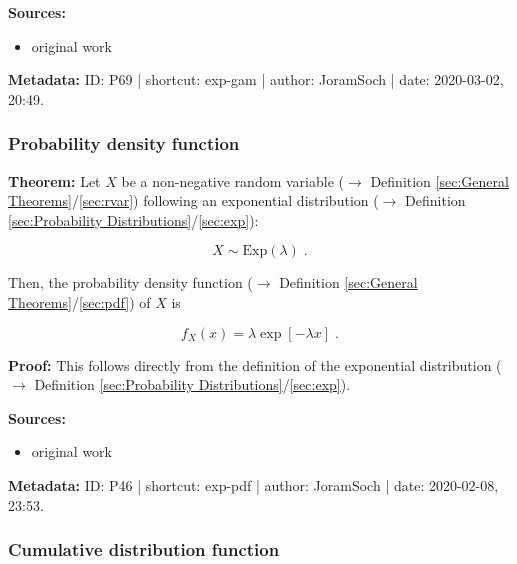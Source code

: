 \documentclass[a4paper,12pt,twoside]{book}
\begin{document}
\vspace{1em}
\textbf{Sources:}
\begin{itemize}
\item original work\end{itemize}


\vspace{1em}
\textbf{Metadata:} ID: P69 | shortcut: exp-gam | author: JoramSoch | date: 2020-03-02, 20:49.
\vspace{1em}



\subsubsection[\textbf{Probability density function}]{Probability density function} \label{sec:exp-pdf}
\setcounter{equation}{0}

\textbf{Theorem:} Let $X$ be a non-negative random variable ($\rightarrow$ Definition \ref{sec:General Theorems}/\ref{sec:rvar}) following an exponential distribution ($\rightarrow$ Definition \ref{sec:Probability Distributions}/\ref{sec:exp}):

\begin{equation} \label{eq:exp-pdf-exp}
X \sim \mathrm{Exp}(\lambda) \; .
\end{equation}

Then, the probability density function ($\rightarrow$ Definition \ref{sec:General Theorems}/\ref{sec:pdf}) of $X$ is

\begin{equation} \label{eq:exp-pdf-gam-pdf}
f_X(x) = \lambda \exp[-\lambda x] \; .
\end{equation}


\vspace{1em}
\textbf{Proof:} This follows directly from the definition of the exponential distribution ($\rightarrow$ Definition \ref{sec:Probability Distributions}/\ref{sec:exp}).


\vspace{1em}
\textbf{Sources:}
\begin{itemize}
\item original work\end{itemize}


\vspace{1em}
\textbf{Metadata:} ID: P46 | shortcut: exp-pdf | author: JoramSoch | date: 2020-02-08, 23:53.
\vspace{1em}



\subsubsection[\textbf{Cumulative distribution function}]{Cumulative distribution function} \label{sec:exp-cdf}
\setcounter{equation}{0}
\end{document}
